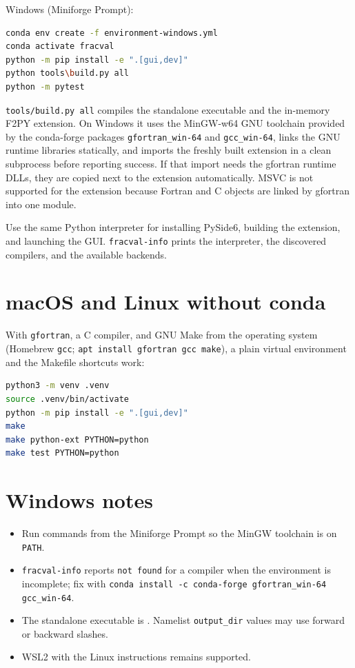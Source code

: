 \documentclass[11pt,oneside]{report}
\newcommand{\code}[1]{\texttt{#1}}
\begin{document}
Windows (Miniforge Prompt):
\begin{lstlisting}[language=bash]
conda env create -f environment-windows.yml
conda activate fracval
python -m pip install -e ".[gui,dev]"
python tools\build.py all
python -m pytest
\end{lstlisting}

\code{tools/build.py all} compiles the standalone executable and the in-memory
F2PY extension. On Windows it uses the MinGW-w64 GNU toolchain provided by the
conda-forge packages \code{gfortran\_win-64} and \code{gcc\_win-64}, links the
GNU runtime libraries statically, and imports the freshly built extension in a
clean subprocess before reporting success. If that import needs the gfortran
runtime DLLs, they are copied next to the extension automatically. MSVC is not
supported for the extension because Fortran and C objects are linked by
gfortran into one module.

\begin{importantbox}
Use the same Python interpreter for installing PySide6, building the
extension, and launching the GUI. \code{fracval-info} prints the interpreter,
the discovered compilers, and the available backends.
\end{importantbox}

\section{macOS and Linux without conda}

With \code{gfortran}, a C compiler, and GNU Make from the operating system
(Homebrew \code{gcc}; \code{apt install gfortran gcc make}), a plain virtual
environment and the Makefile shortcuts work:
\begin{lstlisting}[language=bash]
python3 -m venv .venv
source .venv/bin/activate
python -m pip install -e ".[gui,dev]"
make
make python-ext PYTHON=python
make test PYTHON=python
\end{lstlisting}

\section{Windows notes}

\begin{itemize}
  \item Run commands from the Miniforge Prompt so the MinGW toolchain is on \code{PATH}.
  \item \code{fracval-info} reports \code{not found} for a compiler when the
        environment is incomplete; fix with
        \code{conda install -c conda-forge gfortran\_win-64 gcc\_win-64}.
  \item The standalone executable is . Namelist
        \code{output\_dir} values may use forward or backward slashes.
  \item WSL2 with the Linux instructions remains supported.
\end{itemize}
\end{document}
